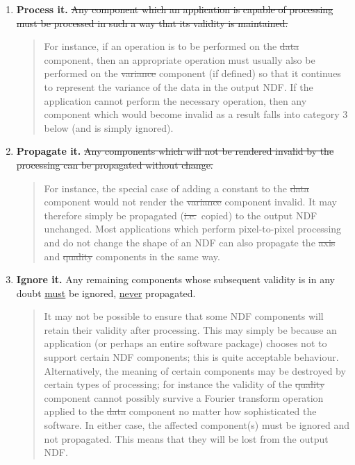 \begin{enumerate}

\item {\bf Process it.}
\st{Any component which an application is capable of processing must be
processed in such a way that its validity is maintained.} 

\small
\begin{quote}
For instance, if an operation is to be performed on the \st{data\/} component,
then an appropriate operation must usually also be performed on the
\st{variance\/} component (if defined) so that it continues to
represent the variance 
of the data in the output NDF.
If the application cannot perform the necessary operation, then any
component which would become invalid as a result falls into category 3
below (and is simply ignored).
\end{quote}
\normalsize

\item {\bf Propagate it.}
\st{Any components which will not be rendered invalid by the processing
can be propagated without change.}

\small
\begin{quote}
For instance, the special case of adding a constant to the \st{data\/} component
would not render the \st{variance\/} component invalid. 
It may therefore simply be propagated (\st{i.e.}\ copied) to the output NDF 
unchanged.
Most applications which perform pixel-to-pixel processing and do not change 
the shape of an NDF can also propagate the \st{axis\/} and \st{quality\/}
components in the same way. 
\end{quote}
\normalsize

\item {\bf Ignore it.}
{Any remaining components whose subsequent validity is in any doubt
\underline{must} be ignored, \underline{never} propagated.} 

\small
\begin{quote}
It may not be possible to ensure that some NDF components will retain their 
validity after processing.
This may simply be because an application (or perhaps an entire software
package) chooses not to support certain NDF components; this is quite
acceptable behaviour.
Alternatively, the meaning of certain components may be destroyed by certain
types of processing; for instance the validity of the \st{quality\/} component
cannot possibly survive a Fourier transform operation applied to the \st{data\/}
component no matter how sophisticated the software.
In either case, the affected component(s) must be ignored and not 
propagated.
This means that they will be lost from the output NDF.

\end{quote}
\normalsize

\end{enumerate}

